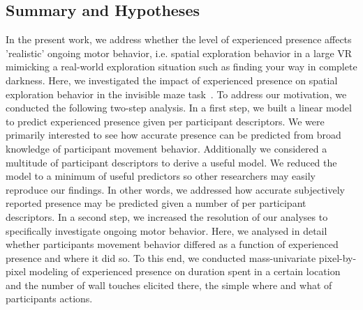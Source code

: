 \subsection{Summary and Hypotheses}
In the present work, we address whether the level of experienced presence affects 'realistic' ongoing motor behavior, i.e. spatial exploration behavior in a large VR mimicking a real-world exploration situation such as finding your way in complete darkness. Here, we investigated the impact of experienced presence on spatial exploration behavior in the invisible maze task~\cite{Gehrke2018}. To address our motivation, we conducted the following two-step analysis. In a first step, we built a linear model to predict experienced presence given per participant descriptors. We were primarily interested to see how accurate presence can be predicted from broad knowledge of participant movement behavior. Additionally we considered a multitude of participant descriptors to derive a useful model. We reduced the model to a minimum of useful predictors so other researchers may easily reproduce our findings. In other words, we addressed how accurate subjectively reported presence may be predicted given a number of per participant descriptors.
In a second step, we increased the resolution of our analyses to specifically investigate ongoing motor behavior. Here, we analysed in detail whether participants movement behavior differed as a function of experienced presence and where it did so. To this end, we conducted mass-univariate pixel-by-pixel modeling of experienced presence on duration spent in a certain location and the number of wall touches elicited there, the simple where and what of participants actions.


